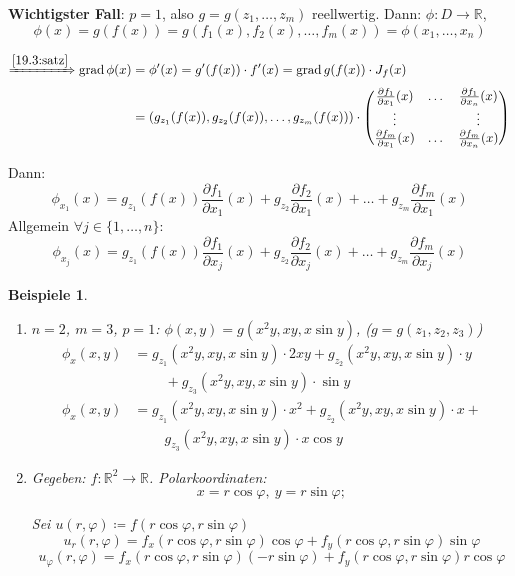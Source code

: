 \documentclass[12pt]{extreport} %
\newcommand{\R}{\mathbb{R}}
\theoremstyle{named}
\theoremstyle{nnamed}
\theoremstyle{itshape}
\theoremstyle{normal}
\newtheorem*{beispiele}{Beispiele}
\begin{document}
\textbf{Wichtigster Fall}: $p = 1$, also $g = g(z_{1}, \dotsc, z_{m})$ reellwertig. Dann: $\phi \colon D \rightarrow \R$,
	$$ \phi(x) = g(f(x)) = g( f_{1}(x), f_{2}(x), \dotsc, f_{m}(x)) = \phi(x_{1}, \dotsc, x_{n}) $$

\begin{align*}
	\xRightarrow[]{\ref{19.3:satz}} \operatorname{grad} \phi(x) & = \phi'(x) = g'(f(x)) \cdot f'(x) = \operatorname{grad} g(f(x)) \cdot J_{f}(x) \\
		& = \left( g_{z_{1}}(f(x)), g_{z_{2}}(f(x)), \dotsc, g_{z_{m}}(f(x)) \right) \cdot \begin{pmatrix}
			\frac{\partial f_{1}}{\partial x_{1}}(x) & \dotsc & \frac{\partial f_{1}}{\partial x_{n}}(x) \\ \vdots & ~ & \vdots \\ \frac{\partial f_{m}}{\partial x_{1}}(x) & \dotsc & \frac{\partial f_{m}}{\partial x_{n}}(x)
		\end{pmatrix}
\end{align*}

Dann:
	$$ \phi_{x_{1}}(x) = g_{z_{1}}(f(x)) \frac{\partial f_{1}}{\partial x_{1}}(x) + g_{z_{2}} \frac{\partial f_{2}}{\partial x_{1}}(x) + \dotsc + g_{z_{m}} \frac{\partial f_{m}}{\partial x_{1}}(x) $$
Allgemein $\forall j \in \{1, \dotsc, n \}$:
	$$ \phi_{x_{j}}(x) = g_{z_{1}}(f(x)) \frac{\partial f_{1}}{\partial x_{j}}(x) + g_{z_{2}} \frac{\partial f_{2}}{\partial x_{j}}(x) + \dotsc + g_{z_{m}} \frac{\partial f_{m}}{\partial x_{j}}(x) $$

\begin{beispiele} ~\
	\begin{enumerate}
		\item $n = 2$, $m = 3$, $p = 1$: $\phi(x, y) = g(x^{2}y, xy, x \sin y)$, ($g = g(z_{1}, z_{2}, z_{3})$)
			\begin{align*}
				\phi_{x}(x, y) & = g_{z_{1}}(x^{2}y, xy, x \sin y ) \cdot 2 xy + g_{z_{2}}(x^{2}y, xy, x \sin y ) \cdot y \\
				& ~\qquad + g_{z_{3}}(x^{2}y, xy, x \sin y ) \cdot \sin y  \\
				\phi_{x}(x, y) & = g_{z_{1}}(x^{2}y, xy, x \sin y ) \cdot x^{2} + g_{z_{2}}(x^{2}y, xy, x \sin y ) \cdot x + \\
				& ~\qquad g_{z_{3}}(x^{2}y, xy, x \sin y ) \cdot x \cos y 
			\end{align*}
		\item Gegeben: $f \colon \R^{2} \rightarrow \R$. Polarkoordinaten: 
			$$x = r \cos \varphi, ~ y = r \sin \varphi; $$
			
			Sei $u(r, \varphi) \coloneqq f(r \cos \varphi, r \sin \varphi)$
		 	$$ u_{r}(r, \varphi) = f_{x}(r \cos \varphi, r \sin \varphi) \cos \varphi + f_{y}(r \cos \varphi, r \sin \varphi) \sin \varphi $$
		 	$$ u_{\varphi}(r, \varphi) = f_{x}(r \cos \varphi, r \sin \varphi) \left( -r \sin \varphi \right) + f_{y}(r \cos \varphi, r \sin \varphi) r \cos \varphi $$
	\end{enumerate}
\end{beispiele}
\end{document}
